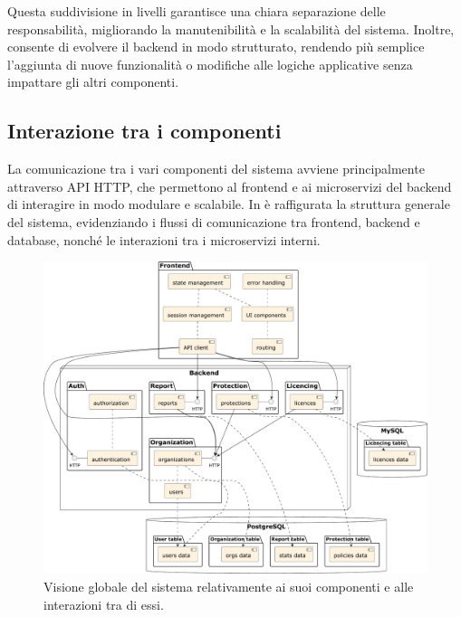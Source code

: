 Questa suddivisione in livelli garantisce una chiara separazione delle responsabilità, migliorando la manutenibilità e la scalabilità del sistema. Inoltre, consente di evolvere il backend in modo strutturato, rendendo più semplice l'aggiunta di nuove funzionalità o modifiche alle logiche applicative senza impattare gli altri componenti.

\subsection{Interazione tra i componenti}
La comunicazione tra i vari componenti del sistema avviene principalmente attraverso API HTTP, che permettono al frontend e ai microservizi del backend di interagire in modo modulare e scalabile. In  è raffigurata la struttura generale del sistema, evidenziando i flussi di comunicazione tra frontend, backend e database, nonché le interazioni tra i microservizi interni.

\begin{figure}
  \centering
  \includegraphics[width=1\textwidth]{figures/global-system-interactions.pdf}
  \caption{Visione globale del sistema relativamente ai suoi componenti e alle interazioni tra di essi.}
  \label{fig:system-interactions}
\end{figure}

